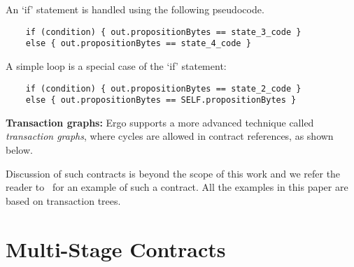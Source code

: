\documentclass[runningheads]{llncs}
\newcommand{\node}{\mathsf{t}}
\begin{document}

An `if' statement is handled using the following pseudocode. 

\begin{verbatim}
    if (condition) { out.propositionBytes == state_3_code }
    else { out.propositionBytes == state_4_code }
\end{verbatim}

A simple loop is a special case of the `if' statement:
\begin{verbatim}
    if (condition) { out.propositionBytes == state_2_code }
    else { out.propositionBytes == SELF.propositionBytes }
\end{verbatim}

\textbf{Transaction graphs:} Ergo supports a more advanced technique called {\em transaction graphs}, where cycles are allowed in contract references, as shown below. 


Discussion of such contracts is beyond the scope of this work and we refer the reader to~\cite[Section 3.3.3]{advtutorial} for an example of such a contract. All the examples in this paper are based on transaction trees.

\section{Multi-Stage Contracts}
\end{document}
